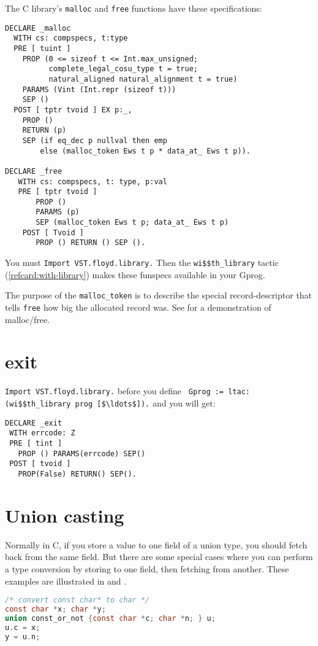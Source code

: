 \documentclass[12pt,fleqn,openany,oneside,showtrims]{memoir}
\newcommand{\ychapter}[2]{\chapter[#1]{#1}}
\begin{document}
The C library's \lstinline|malloc| and \lstinline|free| functions
have these specifications:
\begin{lstlisting}
DECLARE _malloc
  WITH cs: compspecs, t:type
  PRE [ tuint ]
    PROP (0 <= sizeof t <= Int.max_unsigned;
          complete_legal_cosu_type t = true;
          natural_aligned natural_alignment t = true)
    PARAMS (Vint (Int.repr (sizeof t)))
    SEP ()
  POST [ tptr tvoid ] EX p:_,
    PROP ()
    RETURN (p)
    SEP (if eq_dec p nullval then emp
        else (malloc_token Ews t p * data_at_ Ews t p)).

DECLARE _free
   WITH cs: compspecs, t: type, p:val
   PRE [ tptr tvoid ]
       PROP ()
       PARAMS (p)
       SEP (malloc_token Ews t p; data_at_ Ews t p)
    POST [ Tvoid ]
       PROP () RETURN () SEP ().
\end{lstlisting}
You must \lstinline{Import VST.floyd.library.}
Then the \lstinline{wi$$th_library} tactic (\autoref{refcard:with-library})
makes these funspecs available in your Gprog.

The purpose of the \lstinline{malloc_token} is to describe the special
record-descriptor that tells \lstinline{free} how big the allocated
record was.
See  for a demonstration of malloc/free.

\chapter{exit}
\lstinline{Import VST.floyd.library.}
before you define\newline
\lstinline{ Gprog := ltac:(wi$$th_library prog [$\ldots$]).}
\newline and you will get:

\begin{lstlisting}
DECLARE _exit
 WITH errcode: Z
 PRE [ tint ]
   PROP () PARAMS(errcode) SEP()
 POST [ tvoid ]
   PROP(False) RETURN() SEP().
\end{lstlisting}

\ychapter{Union casting}{\file{progs/union.c}}
\label{refcard:union-casting}

Normally in C, if you store a value to one field of a union type, you should fetch back from the same field.  But there are some special cases where you can perform a type conversion by storing to one field, then fetching from another.
These examples are illustrated in 
and .

\begin{lstlisting}[language=C]
/* convert const char* to char */
const char *x; char *y;
union const_or_not {const char *c; char *n; } u;
u.c = x;
y = u.n;
\end{lstlisting}
\end{document}

